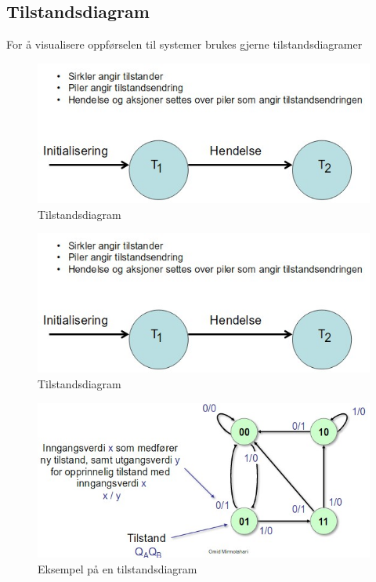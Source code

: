 \documentclass{article}
\begin{document}
	\subsection*{Tilstandsdiagram}
	
	For å visualisere oppførselen til systemer brukes gjerne tilstandsdiagramer
	
	\begin{figure}[H]
		\includegraphics[scale = 0.6]{tilstanddiagram.jpg}
		\caption{Tilstandsdiagram}
	\end{figure}
	
	\begin{figure}[H]
		\includegraphics[scale = 0.6]{tilstanddiagram.jpg}
		\caption{Tilstandsdiagram}
	\end{figure}
	
	\begin{figure}[H]
		\includegraphics[scale = 0.6]{tilstandeks.jpg}
		\caption{Eksempel på en tilstandsdiagram}
	\end{figure}
	
\end{document}
